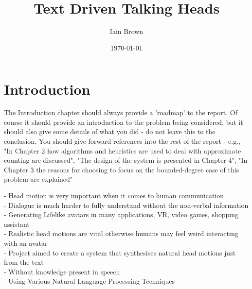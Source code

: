 \documentclass[bsc,frontabs,twoside,singlespacing,parskip]{infthesis}
\begin{document}
\title{Text Driven Talking Heads}

\author{Iain Brown}

\date{\today}
\maketitle
\tableofcontents

\chapter{Introduction}

The Introduction chapter should always provide a 'roadmap' to the report. Of course it should provide an introduction to the problem being considered, but it should also give some details of what you did - do not leave this to the conclusion. You should give forward references into the rest of the report - e.g., "In Chapter 2 how algorithms and heuristics are used to deal with approximate counting are discussed", "The design of the system is presented in Chapter 4", "In Chapter 3 the reasons for choosing to focus on the bounded-degree case of this problem are explained"


- Head motion is very important when it comes to human communication\\
- Dialogue is much harder to fully understand without the non-verbal information\\
- Generating Lifelike avatars in many applications, VR, video games, shopping assistant \\
- Realistic head motions are vital otherwise humans may feel weird interacting with an avatar \\
- Project aimed to create a system that synthesises natural head motions just from the text \\
- Without knowledge present in speech\\
- Using Various Natural Language Processing Techniques \\
\end{document}
